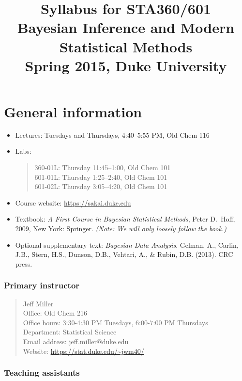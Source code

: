 \documentclass[12pt]{article}
\title{Syllabus for STA360/601\\
\large Bayesian Inference and Modern Statistical Methods\\
Spring 2015, Duke University
}
\author{}
\date{}
\begin{document}
\maketitle

\section{General information}
\begin{itemize}
\item[] Lectures: Tuesdays and Thursdays, 4:40--5:55 PM, Old Chem 116
\item[] Labs:
    \begin{quote}
    360-01L: Thursday 11:45--1:00, Old Chem 101 \\
    601-01L: Thursday 1:25--2:40, Old Chem 101 \\
    601-02L: Thursday 3:05--4:20, Old Chem 101
    \end{quote}
\item[] Course website: \url{https://sakai.duke.edu}
\item[] Textbook: \textit{A First Course in Bayesian Statistical Methods}, Peter D.\ Hoff, 2009, New York: Springer. \textit{(Note: We will only loosely follow the book.)}
\item[] Optional supplementary text:  \textit{Bayesian Data Analysis}. Gelman, A., Carlin, J.B., Stern, H.S., Dunson, D.B., Vehtari, A., \& Rubin, D.B. (2013). CRC press.
\end{itemize}

\subsubsection*{Primary instructor}
\begin{quote}
Jeff Miller \\
Office: Old Chem 216 \\
Office hours: 3:30-4:30 PM Tuesdays, 6:00-7:00 PM Thursdays \\
Department: Statistical Science \\ 
Email address: jeff.miller@duke.edu \\
Website: \url{https://stat.duke.edu/~jwm40/}
\end{quote}


\subsubsection*{Teaching assistants}
\end{document}
